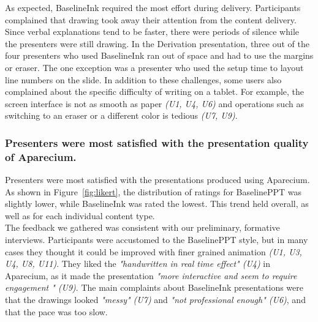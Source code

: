 As expected, BaselineInk required the most effort during delivery. Participants complained that drawing took away their attention from the content delivery. Since verbal explanations tend to be faster, there were periods of silence while the presenters were still drawing. In the Derivation presentation, three out of the four presenters who used BaselineInk ran out of space and had to use the margins or eraser. The one exception was a presenter who used the setup time to layout line numbers on the slide. In addition to these challenges, some users also complained about the specific difficulty of writing on a tablet. For example, the screen interface is not as smooth as paper \textit{(U1, U4, U6)} and operations such as switching to an eraser or a different color is tedious \textit{(U7, U9)}. 

\subsubsection{Presenters were most satisfied with the presentation quality of Aparecium.}
Presenters were most satisfied with the presentations produced using Aparecium. As shown in Figure~\ref{fig:likert}, the distribution of ratings for BaselinePPT was slightly lower, while BaselineInk was rated the lowest.
%
%
This trend held overall, as well as for each individual content type.\\

The feedback we gathered was consistent with our preliminary, formative interviews. Participants were accustomed to the BaselinePPT style, but in many cases they thought it could be improved with finer grained animation \textit{(U1, U3, U4, U8, U11)}. They liked the \textit{"handwritten in real time effect" (U4)}   in Aparecium, as it made the presentation \textit{"more interactive and seem to require engagement " (U9)}. The main complaints about BaselineInk presentations were that the drawings looked \textit{"messy" (U7)} and \textit{"not professional enough" (U6)}, and that the pace was too slow.\\

